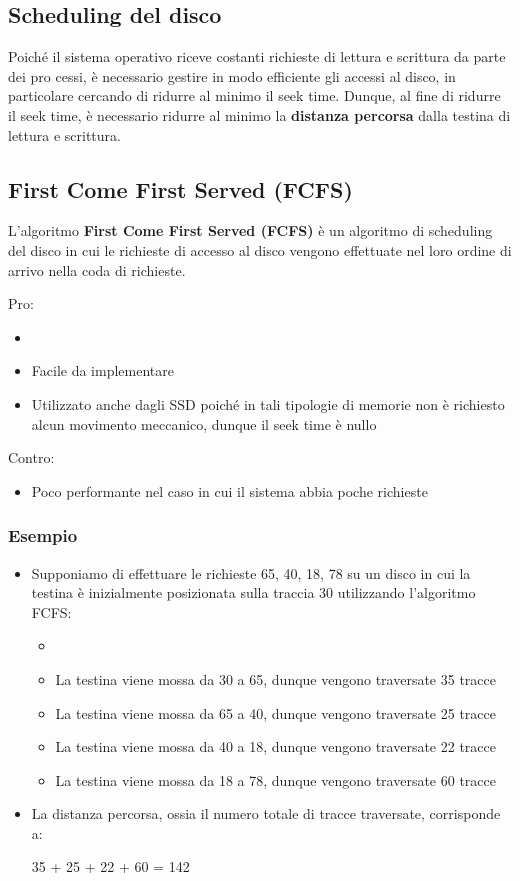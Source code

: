 \documentclass{article}
\begin{document}
\subsection{Scheduling del disco}
Poiché il sistema operativo riceve costanti richieste di lettura e scrittura da parte dei pro cessi, è necessario gestire in modo efficiente gli accessi al disco, in particolare cercando di ridurre al minimo il seek time. Dunque, al fine di ridurre il seek time, è necessario ridurre al minimo la \textbf{distanza percorsa} dalla testina di lettura e scrittura.

\subsection{First Come First Served (FCFS)}
L'algoritmo \textbf{First Come First Served (FCFS)} è un algoritmo di scheduling del disco in cui le richieste di accesso al disco vengono effettuate nel loro ordine di arrivo nella coda di richieste.\par
Pro:
\begin{itemize}
    \item 
    \item Facile da implementare
    \item Utilizzato anche dagli SSD poiché in tali tipologie di memorie non è richiesto alcun movimento meccanico, dunque il seek time è nullo
\end{itemize}
Contro:
\begin{itemize}
    \item Poco performante nel caso in cui il sistema abbia poche richieste
\end{itemize}
\subsubsection{Esempio}
\begin{itemize}
    \item Supponiamo di effettuare le richieste 65, 40, 18, 78 su un disco in cui la testina è inizialmente posizionata sulla traccia 30 utilizzando l'algoritmo FCFS:
    \begin{itemize}
        \item 
        \item La testina viene mossa da 30 a 65, dunque vengono traversate 35 tracce 
        \item La testina viene mossa da 65 a 40, dunque vengono traversate 25 tracce 
        \item La testina viene mossa da 40 a 18, dunque vengono traversate 22 tracce 
        \item La testina viene mossa da 18 a 78, dunque vengono traversate 60 tracce
    \end{itemize}
    \item La distanza percorsa, ossia il numero totale di tracce traversate, corrisponde a:
    \begin{center}
        35 + 25 + 22 + 60 = 142
    \end{center}
\end{itemize}
\end{document}
